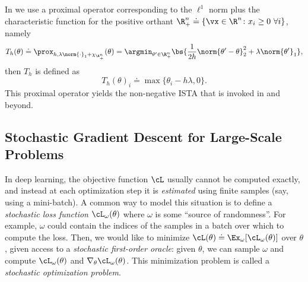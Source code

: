 \documentclass[../../book-main.tex]{subfiles}
\begin{document}
\begin{example}\label{example:prox-of-nonnegative-l1}
    In  we use a proximal operator
    corresponding to the \(\ell^{1}\) norm plus the characteristic
    function for the positive orthant \(\R_{+}^{n} \doteq \{\vx \in
    \R^{n} \colon x_{i} \geq 0\ \forall i\}\), namely
    \begin{equation}
        T_{h}(\theta) \doteq \prox_{h, \lambda\norm{\cdot}_{1} +
        \chi_{\R_{+}^{n}}}(\theta) = \argmin_{\theta^{\prime} \in
        \R_{+}^{n}}\bs{\frac{1}{2h}\norm{\theta^{\prime} -
        \theta}_{2}^{2} + \lambda\norm{\theta^{\prime}}_{1}},
    \end{equation}
    then \(T_{h}\) is defined as
    \begin{equation}
        T_{h}(\theta)_{i} \doteq \max\{\theta_{i} - h\lambda, 0\}.
    \end{equation}
    This proximal operator yields the non-negative ISTA that is
    invoked in  and beyond.
\end{example}

\subsection{Stochastic Gradient Descent for Large-Scale Problems}

In deep learning, the objective function \(\cL\) usually cannot be
computed exactly, and instead at each optimization step it is
\textit{estimated} using finite samples (say, using a mini-batch). A
common way to model this situation is to define a \textit{stochastic
loss function} \(\cL_{\omega}(\theta)\) where \(\omega\) is some
``source of randomness''. For example, \(\omega\) could contain the
indices of the samples in a batch over which to compute the loss.
Then, we would like to minimize \(\cL(\theta) \doteq
\Ex_{\omega}[\cL_{\omega}(\theta)]\) over \(\theta\), given access to
a \textit{stochastic first-order oracle}: given \(\theta\), we can
sample \(\omega\) and compute \(\cL_{\omega}(\theta)\) and
\(\nabla_{\theta}\cL_{\omega}(\theta)\). This minimization problem is
called a \textit{stochastic optimization problem}.
\end{document}
